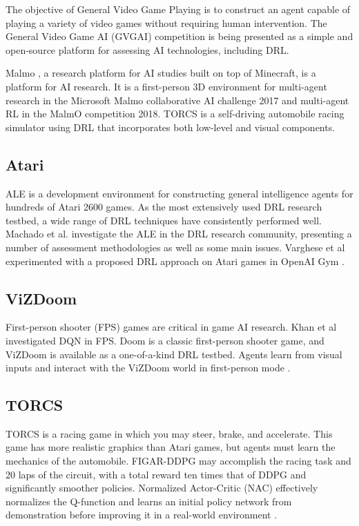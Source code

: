 \documentclass{article}
\begin{document}
The objective of General Video Game Playing is to construct
an agent capable of playing a variety of video games without
requiring human intervention. The General Video Game AI
(GVGAI) competition \cite{torrado2018deep} is being presented as a simple and
open-source platform for assessing AI technologies, including
DRL.

Malmo \cite{johnson2016malmo}, a research platform for AI studies built on top of
Minecraft, is a platform for AI research. It is a first-person 3D
environment for multi-agent research in the Microsoft Malmo
collaborative AI challenge 2017 and multi-agent RL in the
MalmO competition 2018. TORCS \cite{espie2005torcs} is a self-driving
automobile racing simulator using DRL that incorporates both
low-level and visual components.

\subsection{Atari}
ALE is a development environment for constructing general
intelligence agents for hundreds of Atari 2600 games. As the most extensively used DRL research testbed, a wide range of DRL techniques have consistently performed well. Machado et al. investigate the ALE in the DRL research community, presenting a number of assessment methodologies as well as some main issues. Varghese et al experimented with a proposed DRL approach on Atari games in OpenAI Gym \cite{varghese2021hybrid}.
\subsection{ViZDoom}
First-person shooter (FPS) games are critical in game AI
research. Khan et al investigated DQN in FPS. Doom is a classic first-person shooter game, and ViZDoom is
available as a one-of-a-kind DRL testbed. Agents learn from visual inputs and interact with the ViZDoom world in first-person mode \cite{kempka2016vizdoom}. 
\subsection{TORCS}
TORCS is a racing game in which you may steer, brake, and
accelerate. This game has more realistic graphics than Atari games, but agents must learn the mechanics of the automobile. FIGAR-DDPG may accomplish the racing task and 20 laps of the circuit, with a total reward ten times that of DDPG and significantly smoother policies. Normalized Actor-Critic (NAC) effectively normalizes the Q-function and learns an initial policy network from demonstration before improving it in a real-world environment \cite{gao2018reinforcement}. 
\end{document}
